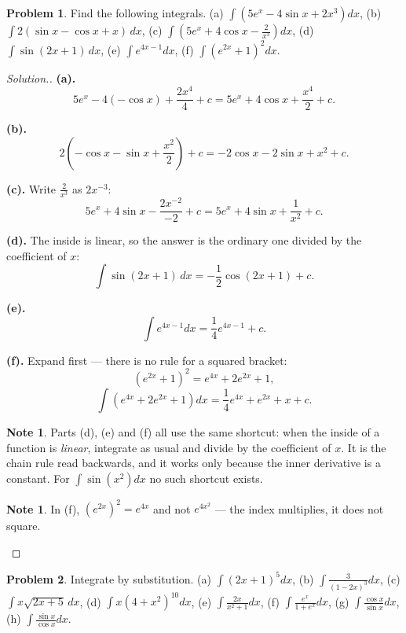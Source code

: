 \documentclass[11pt,a4paper]{article}
\theoremstyle{definition}
\newtheorem{note}[thm]{Note}
\newtheorem{problemx}{Problem}[section]
\newenvironment{problem}{\begin{problemx}}{\end{problemx}}
\newenvironment{solution}
  {\renewcommand{\qedsymbol}{}\begin{proof}[\textit{Solution}.]}
  {\end{proof}}
\begin{document}
\begin{problem}
Find the following integrals.
\quad (a) $\int\left(5e^x-4\sin x+2x^3\right)dx$, \quad
(b) $\int 2(\sin x-\cos x+x)\,dx$, \quad
(c) $\int\left(5e^x+4\cos x-\frac{2}{x^3}\right)dx$, \quad
(d) $\int\sin(2x+1)\,dx$, \quad (e) $\int e^{4x-1}dx$, \quad
(f) $\int\left(e^{2x}+1\right)^2dx$.
\end{problem}

\begin{solution}
\textbf{(a).}
$$5e^x-4(-\cos x)+\frac{2x^4}{4}+c=5e^x+4\cos x+\frac{x^4}{2}+c.$$

\textbf{(b).}
$$2\left(-\cos x-\sin x+\frac{x^2}{2}\right)+c=-2\cos x-2\sin x+x^2+c.$$

\textbf{(c).} Write $\frac{2}{x^3}$ as $2x^{-3}$:
$$5e^x+4\sin x-\frac{2x^{-2}}{-2}+c=5e^x+4\sin x+\frac{1}{x^2}+c.$$

\textbf{(d).} The inside is linear, so the answer is the ordinary one divided by the
coefficient of $x$:
$$\int\sin(2x+1)\,dx=-\frac{1}{2}\cos(2x+1)+c.$$

\textbf{(e).}
$$\int e^{4x-1}dx=\frac{1}{4}e^{4x-1}+c.$$

\textbf{(f).} Expand first --- there is no rule for a squared bracket:
$$\left(e^{2x}+1\right)^2=e^{4x}+2e^{2x}+1,$$
$$\int\left(e^{4x}+2e^{2x}+1\right)dx=\frac{1}{4}e^{4x}+e^{2x}+x+c.$$

\begin{note}
Parts (d), (e) and (f) all use the same shortcut: when the inside of a function is
\emph{linear}, integrate as usual and divide by the coefficient of $x$. It is the chain
rule read backwards, and it works only because the inner derivative is a constant. For
$\int\sin\left(x^2\right)dx$ no such shortcut exists.
\end{note}

\begin{note}
In (f), $\left(e^{2x}\right)^2=e^{4x}$ and not $e^{4x^2}$ --- the index multiplies, it
does not square.
\end{note}
\end{solution}

\begin{problem}
Integrate by substitution.
\quad (a) $\int(2x+1)^5dx$, \quad (b) $\int\frac{3}{(1-2x)^3}dx$, \quad
(c) $\int x\sqrt{2x+5}\,dx$, \quad (d) $\int x\left(4+x^2\right)^{10}dx$, \quad
(e) $\int\frac{2x}{x^2+1}dx$, \quad (f) $\int\frac{e^x}{1+e^x}dx$, \quad
(g) $\int\frac{\cos x}{\sin x}dx$, \quad (h) $\int\frac{\sin x}{\cos x}dx$.
\end{problem}
\end{document}
